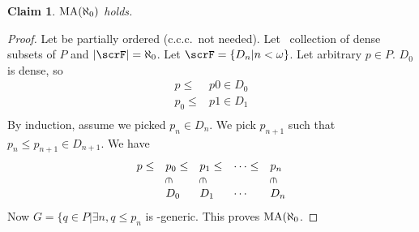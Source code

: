 \documentclass[11pt,pdftex,twoside,a4paper]{article}
\newcommand{\ccc}{c.c.c.}
\newcommand{\MA}{\mathop{\rm MA}\nolimits}
\newcommand{\crotin}{\rotatebox[origin=c]{-90}{\(\in\)}}
\newtheorem{claim}[thm]{Claim}
\begin{document}
\begin{claim}
\(\MA(\aleph_0)\) holds.
\end{claim}
\begin{proof}
Let  be partially ordered (\ccc\ not needed).
Let \scrF\ collection of dense subsets of $P$
and \(|\scrF| = \aleph_0\). Let \(\scrF = \{D_n| n < \omega\}\).
Let arbitrary \(p\in P\).  \(D_0\) is dense, so 
\begin{align*}
p \leq & p0 \in D_0 \\
p_0 \leq & p1 \in D_1 \\
\end{align*}
By induction, assume we picked \(p_n \in D_n\).
We pick \(p_{n+1}\) such that \(p_n \leq p_{n+1} \in D_{n+1}\).
We have 
\begin{equation*}
\begin{array}{lllll}
p \leq & p_0 \leq & p_1 \leq &\cdots \leq & p_n \\
       &\crotin   &\crotin   &            & \crotin \\
       & D_0      & D_1      &\cdots      & D_n
\end{array}
\end{equation*}
Now \(G = \{q \in P |\exists n, q \leq p_n\) is \scrF-generic.
This proves \(\MA(\aleph_0\).
\end{proof}
\end{document}
